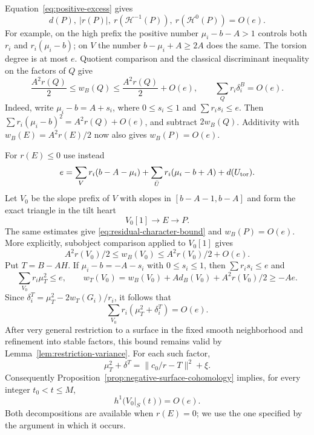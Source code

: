 Equation~\eqref{eq:positive-excess} gives
\begin{equation}\label{eq:residual-character-bound}
 d(P),\ |r(P)|,\ r(\mathcal H^{-1}(P)),\
 r(\mathcal H^0(P))=O(e).
\end{equation}
For example, on the high prefix the positive number
$\mu_i-b-A>1$ controls both $r_i$ and $r_i(\mu_i-b)$; on $V$ the
number $b-\mu_i+A\geq2A$ does the same.  The torsion degree is at
most $e$.  Quotient comparison and the classical discriminant
inequality on the factors of $Q$ give
\begin{equation}\label{eq:positive-tail-moments}
 \frac{A^2r(Q)}2\leq w_B(Q)
 \leq\frac{A^2r(Q)}2+O(e),\qquad
 \sum_Qr_i\delta_i^B=O(e).
\end{equation}
Indeed, write $\mu_i-b=A+s_i$, where $0\leq s_i\leq1$ and
$\sum r_is_i\leq e$.  Then
$\sum r_i(\mu_i-b)^2=A^2r(Q)+O(e)$, and subtract $2w_B(Q)$.
Additivity with $w_B(E)=A^2r(E)/2$ now also gives $w_B(P)=O(e)$.

For $r(E)\leq0$ use instead
\begin{equation}\label{eq:negative-excess}
 e=\sum_Vr_i(b-A-\mu_i)
   +\sum_{\bar U}r_i(\mu_i-b+A)+d(U_{\rm tor}).
\end{equation}
Let $V_0$ be the slope prefix of $V$ with slopes in
$[b-A-1,b-A]$ and form the exact triangle in the tilt heart
\begin{equation}\label{eq:negative-residual-triangle}
 V_0[1]\longrightarrow E\longrightarrow P.
\end{equation}
The same estimates give \eqref{eq:residual-character-bound} and
$w_B(P)=O(e)$.  More explicitly, subobject comparison applied to
$V_0[1]$ gives
\[
 A^2r(V_0)/2\leq w_B(V_0)\leq A^2r(V_0)/2+O(e).
\]
Put $T=B-AH$.  If $\mu_i-b=-A-s_i$ with $0\leq s_i\leq1$,
then $\sum r_is_i\leq e$ and
\[
 \sum_{V_0}r_i\mu_T^2\leq e,\qquad
 w_T(V_0)=w_B(V_0)+A d_B(V_0)+A^2r(V_0)/2\geq-Ae.
\]
Since $\delta_i^T=\mu_T^2-2w_T(G_i)/r_i$, it follows that
\begin{equation}\label{eq:negative-tail-energy}
 \sum_{V_0}r_i(\mu_T^2+\delta_i^T)=O(e).
\end{equation}
After very general restriction to a surface in the fixed smooth
neighborhood and refinement into stable factors, this bound remains
valid by Lemma~\ref{lem:restriction-variance}.  For each such factor,
\[
 \mu_T^2+\delta^T=\|c_0/r-T\|^2+\xi.
\]
Consequently Proposition~\ref{prop:negative-surface-cohomology}
implies, for every integer $t_0<t\leq M$,
\begin{equation}\label{eq:negative-tail-h1}
 h^1\bigl(V_0|_S(t)\bigr)=O(e).
\end{equation}
Both decompositions are available when $r(E)=0$; we use the one
specified by the argument in which it occurs.

